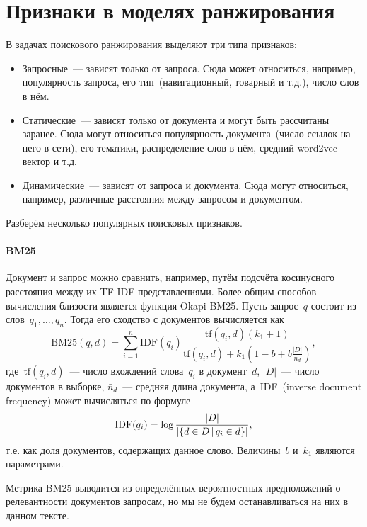 \documentclass[12pt,fleqn]{article}
\begin{document}
\section{Признаки в моделях ранжирования}
В задачах поискового ранжирования выделяют три типа признаков:
\begin{itemize}
    \item Запросные~--- зависят только от запроса.
        Сюда может относиться, например, популярность запроса,
        его тип~(навигационный, товарный и т.д.),
        число слов в нём.
    \item Статические~--- зависят только от документа и могут быть рассчитаны заранее.
        Сюда могут относиться популярность документа~(число ссылок на него в сети),
        его тематики, распределение слов в нём, средний word2vec-вектор и т.д.
    \item Динамические~--- зависят от запроса и документа.
        Сюда могут относиться, например, различные расстояния между запросом и документом.
\end{itemize}
Разберём несколько популярных поисковых признаков.

\paragraph{BM25}
Документ и запрос можно сравнить, например, путём подсчёта косинусного расстояния
между их TF-IDF-представлениями.
Более общим способов вычисления близости является функция Okapi BM25.
Пусть запрос~$q$ состоит из слов~$q_1, \dots, q_n$.
Тогда его сходство с документов вычисляется как
\[
    \text{BM25}(q, d)
    =
    \sum_{i = 1}^{n}
        \text{IDF}(q_i)
        \frac{
            \text{tf}(q_i, d)
            (k_1 + 1)
        }{
            \text{tf}(q_i, d)
            +
            k_1 \left(
                1 - b + b \frac{|D|}{\bar n_d}
            \right)
        },
\]
где~$\text{tf}(q_i, d)$~--- число вхождений слова~$q_i$ в документ~$d$,
$|D|$~--- число документов в выборке,
$\bar n_d$~--- средняя длина документа,
а~IDF~(inverse document frequency) может вычисляться по формуле
\[
    \text{IDF}(q_i)
    =
    \log \frac{
        |D|
    }{
        |\{d \in D \mspace{3mu}{|}\mspace{3mu} q_i \in d\}|
    },
\]
т.е. как доля документов, содержащих данное слово.
Величины~$b$ и~$k_1$ являются параметрами.

Метрика BM25 выводится из определённых вероятностных предположений о релевантности
документов запросам, но мы не будем останавливаться на них в данном тексте.
\end{document}
